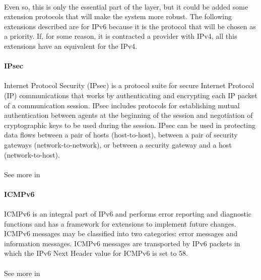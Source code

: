 \paragraph{}
Even so, this is only the essential part of the layer, but it could be added some extension protocols that will make the system more robust. The following extensions described are for IPv6 because it is the protocol that will be chosen as a priority. If, for some reason, it is contracted a provider with IPv4, all this extensions have an equivalent for the IPv4.

\paragraph{} \textbf{IPsec}
\paragraph{}
Internet Protocol Security (IPsec) is a protocol suite for secure Internet Protocol (IP) communications that works by authenticating and encrypting each IP packet of a communication session. IPsec includes protocols for establishing mutual authentication between agents at the beginning of the session and negotiation of cryptographic keys to be used during the session. IPsec can be used in protecting data flows between a pair of hosts (host-to-host), between a pair of security gateways (network-to-network), or between a security gateway and a host (network-to-host). 
\paragraph{}
See more in \cite{IPsec}

\paragraph{} \textbf{ICMPv6}
\paragraph{}
ICMPv6 is an integral part of IPv6 and performs error reporting and diagnostic functions and has a framework for extensions to implement future changes. ICMPv6 messages may be classified into two categories: error messages and information messages. ICMPv6 messages are transported by IPv6 packets in which the IPv6 Next Header value for ICMPv6 is set to 58.
\paragraph{}
See more in \cite{ICMP}

